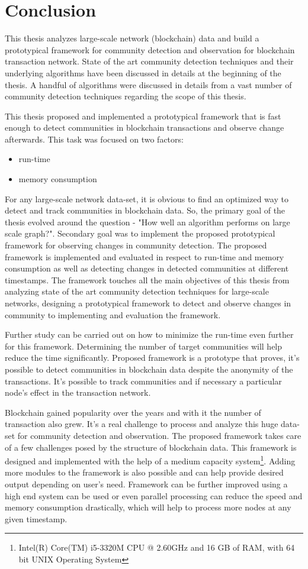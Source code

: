 \chapter{Conclusion}\label{cha:conclusion}

This thesis analyzes large-scale network (blockchain) data and build a prototypical framework for community detection and observation for blockchain transaction network. State of the art community detection techniques and their underlying algorithms have been discussed in details at the beginning of the thesis. A handful of algorithms were discussed in details from a vast number of community detection techniques regarding the scope of this thesis.

This thesis proposed and implemented a prototypical framework that is fast enough to detect communities in blockchain transactions and observe change afterwards. This task was focused on two factors: 
\begin{itemize}
	\item run-time
	\item memory consumption
\end{itemize}
\noindent For any large-scale network data-set, it is obvious to find an optimized way to detect and track communities in blockchain data. So, the primary goal of the thesis evolved around the question - "How well an algorithm performs on large scale graph?". Secondary goal was to implement the proposed prototypical framework for observing changes in community detection. The proposed framework is implemented and evaluated in respect to run-time and memory consumption as well as detecting changes in detected communities at different timestamps. The framework touches all the main objectives of this thesis from analyzing state of the art community detection techniques for large-scale networks, designing a prototypical framework to detect and observe changes in community to implementing and evaluation the framework.

Further study can be carried out on how to minimize the run-time even further for this framework. Determining the number of target communities will help reduce the time significantly. Proposed framework is a prototype that proves, it's possible to detect communities in blockchain data despite the anonymity of the transactions. It's possible to track communities and if necessary a particular node's effect in the transaction network.

Blockchain gained popularity over the years and with it the number of transaction also grew. It's a real challenge to process and analyze this huge data-set for community detection and observation. The proposed framework takes care of a few challenges posed by the structure of blockchain data. This framework is designed and implemented with the help of a medium capacity system\footnote{Intel(R) Core(TM) i5-3320M CPU @ 2.60GHz and 16 GB of RAM, with 64 bit UNIX Operating System}. Adding more modules to the framework is also possible and can help provide desired output depending on user's need. Framework can be further improved using a high end system can be used or even parallel processing can reduce the speed and memory consumption drastically, which will help to process more nodes at any given timestamp.

